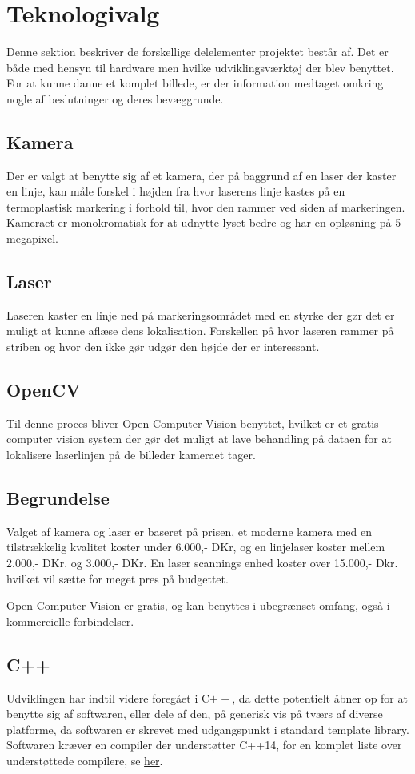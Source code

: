 \section{Teknologivalg}
Denne sektion beskriver de forskellige delelementer projektet består af. Det er både med hensyn til hardware men hvilke udviklingsværktøj der blev benyttet. For at kunne danne et komplet billede, er der information medtaget omkring nogle af beslutninger og deres bevæggrunde. 

\subsection{Kamera}
Der er valgt at benytte sig af et kamera, der på baggrund af en laser der kaster en linje, kan måle forskel i højden fra hvor laserens linje kastes på en termoplastisk markering i forhold til, hvor den rammer ved siden af markeringen.
Kameraet er monokromatisk for at udnytte lyset bedre og har en opløsning på 5 megapixel.

\subsection{Laser}
Laseren kaster en linje ned på markeringsområdet med en styrke der gør det er muligt at kunne aflæse dens lokalisation. Forskellen på hvor laseren rammer på striben og hvor den ikke gør udgør den højde der er interessant.

\subsection{OpenCV}
Til denne proces bliver Open Computer Vision \cite{OpenCV} benyttet, hvilket er et gratis computer vision system der gør det muligt at lave behandling på dataen for at lokalisere laserlinjen på de billeder kameraet tager.

\subsection{Begrundelse}
Valget af kamera og laser er baseret på prisen, et moderne kamera med en tilstrækkelig kvalitet koster under 6.000,- DKr, og en linjelaser koster mellem 2.000,- DKr. og 3.000,- DKr. En laser scannings enhed koster over 15.000,- Dkr. hvilket vil sætte for meget pres på budgettet.

Open Computer Vision er gratis, og kan benyttes i ubegrænset omfang, også i kommercielle forbindelser.

\subsection{C++}
Udviklingen har indtil videre foregået i C$++$, da dette potentielt åbner op for at benytte sig af softwaren, eller dele af den, på generisk vis på tværs af diverse platforme, da softwaren er skrevet med udgangspunkt i standard template library.
Softwaren kræver en compiler der understøtter C++14, for en komplet liste over understøttede compilere, se \href{http://en.cppreference.com/w/cpp/compiler_support}{her}.


